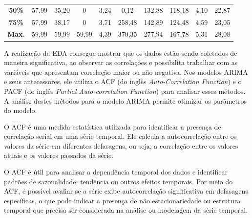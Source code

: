 \begin{table}[!htb]
\begin{tabular}{@{}cccccccccc@{}}
		\textbf{50\%}                          & 57,99                           & 35,20                           & 0                               & 3,24                              & 0,12                              & 132,88                            & 118,18                            & 4,10                              & 22,87                             \\
		\textbf{75\%}                          & 57,99                           & 38,17                           & 0                               & 3,71                              & 258,48                            & 142,89                            & 124,48                            & 4,59                              & 23,05                             \\
		\textbf{Max.}                          & 59,99                           & 59,99                           & 59,99                           & 4,39                              & 370,35                            & 277,94                            & 167,78                            & 5,31                              & 28,08                             \\ \bottomrule
	\end{tabular}
	
	
\end{table}



A realização da EDA consegue mostrar que os dados estão sendo coletados de maneira significativa, ao observar as correlações e possibilita trabalhar com as variáveis que apresentam correlação maior ou não negativa. Nos modelos ARIMA e seus antecessores, ele utiliza o ACF (do inglês \textit{\textit{Auto-Correlation Function}}) e o PACF (do inglês \textit{Partial Auto-correlation Function}) para analisar esses métodos. A análise destes métodos para o modelo ARIMA permite otimizar os parâmetros do modelo.

O ACF é uma medida estatística utilizada para identificar a presença de correlação serial em uma série temporal. Ele calcula a autocorrelação entre os valores da série em diferentes defasagens, ou seja, a correlação entre os valores atuais e os valores passados da série. 

O ACF é útil para analisar a dependência temporal dos dados e identificar padrões de sazonalidade, tendência ou outros efeitos temporais. Por meio do ACF, é possível avaliar se a série exibe autocorrelação significativa em defasagens específicas, o que pode indicar a presença de não estacionariedade ou estrutura temporal que precisa ser considerada na análise ou modelagem da série temporal.


